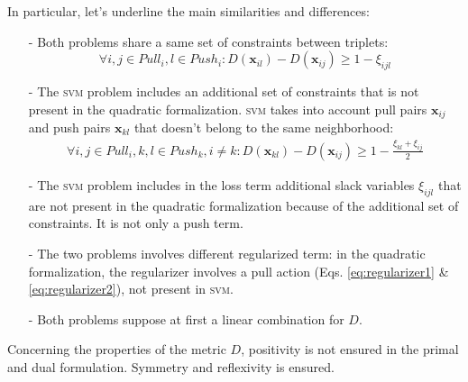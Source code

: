 \noindent In particular, let's underline the main similarities and differences:
\begin{itemize}
	\item[-] Both problems share a same set of constraints between triplets:
		\begin{equation*}
			\forall i,j \in Pull_i,l \in Push_i:
			D(\textbf{x}_{il})-D(\textbf{x}_{ij}) \geq 1-\xi_{ijl}
		\end{equation*}
	\item[-] The \textsc{svm} problem includes an additional set of constraints that is not present in the quadratic formalization. \textsc{svm} takes into account pull pairs $\textbf{x}_{ij}$ and push pairs $\textbf{x}_{kl}$ that doesn't belong to the same neighborhood:
		\begin{align*}
			\forall i,j \in Pull_i,k,l \in Push_k, i \neq k: 
			D(\textbf{x}_{kl})-D(\textbf{x}_{ij}) \geq 1-\frac{\xi_{kl}+\xi_{ij}}{2}	
		\end{align*}
	\item[-] The \textsc{svm} problem includes in the loss term additional slack variables $\xi_{ijl}$ that are not present in the quadratic formalization because of the additional set of constraints. It is not only a push term.
	\item[-] The two problems involves different regularized term: in the quadratic formalization, the regularizer involves a pull action (Eqs. \ref{eq:regularizer1} \& \ref{eq:regularizer2}), not present in \textsc{svm}.
	\item[-] Both problems suppose at first a linear combination for $D$.
\end{itemize}

Concerning the properties of the metric $D$, positivity is not ensured in the primal and dual formulation.
Symmetry and reflexivity is ensured.

